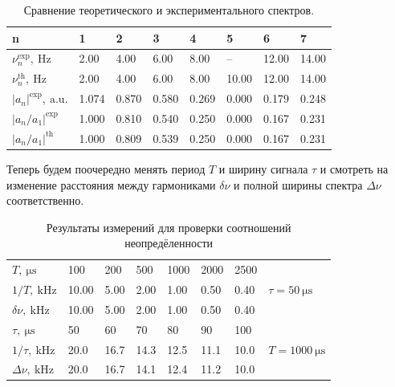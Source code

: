 \documentclass[12pt, a4paper]{article}
\begin{document}
\begin{table}[H]
  \begin{tabular}{|l|l|l|l|l|l|l|l|}
    \hline
    n                            & 1     & 2     & 3     & 4     & 5     & 6     & 7     \\ \hline
    $\nu_n^\text{exp},~\mathrm{Hz}$   & 2.00  & 4.00  & 6.00  & 8.00  & --    & 12.00 & 14.00 \\ \hline
    $\nu_n^\text{th},~\mathrm{Hz}$    & 2.00  & 4.00  & 6.00  & 8.00  & 10.00 & 12.00 & 14.00 \\ \hline
    $|a_n|^\text{exp},~\mathrm{a.u.}$ & 1.074 & 0.870 & 0.580 & 0.269 & 0.000 & 0.179 & 0.248 \\ \hline
    $|a_n/a_1|^\text{exp}$            & 1.000 & 0.810 & 0.540 & 0.250 & 0.000 & 0.167 & 0.231 \\ \hline
    $|a_n/a_1|^\text{th}$             & 1.000 & 0.809 & 0.539 & 0.250 & 0.000 & 0.167 & 0.231 \\ \hline
  \end{tabular}
  \caption{Сравнение теоретического и экспериментального спектров.}
  \label{spectracomparison}
\end{table}

Теперь будем поочередно менять период $T$ и ширину сигнала $\tau$ и смотреть на изменение расстояния между гармониками $\delta \nu$ и полной ширины спектра $\Delta \nu$ соответственно.

\begin{table}[H]
  \begin{tabular}{|l|l|l|l|l|l|l|l|}
    \hline
    $T,~\mathrm{\mu s}$        & 100   & 200  & 500  & 1000 & 2000 & 2500 & \multirow{3}{*}{$\tau = 50~\mathrm{\mu s}$} \\ \cline{1-7}
    $1/T,~\mathrm{kHz}$        & 10.00 & 5.00 & 2.00 & 1.00 & 0.50 & 0.40 &                                             \\ \cline{1-7}
    $\delta \nu,~\mathrm{kHz}$ & 10.00 & 5.00 & 2.00 & 1.00 & 0.50 & 0.40 &                                             \\ \hline
    $\tau,~\mathrm{\mu s}$     & 50    & 60   & 70   & 80   & 90   & 100  & \multirow{3}{*}{$T = 1000~\mathrm{\mu s}$}  \\ \cline{1-7}
    $1/\tau,~\mathrm{kHz}$    & 20.0  & 16.7 & 14.3 & 12.5 & 11.1 & 10.0 &                                             \\ \cline{1-7}
    $\Delta \nu,~\mathrm{kHz}$ & 20.0  & 16.7 & 14.1 & 12.4 & 11.2 & 10.0 &                                             \\ \hline
  \end{tabular}
  \caption{Результаты измерений для проверки соотношений неопредёленности}
  \label{ndeftable}
\end{table}
\end{document}

